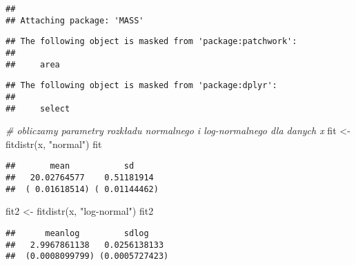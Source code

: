 \documentclass[
]{book}
\newenvironment{Shaded}{\begin{snugshade}}{\end{snugshade}}
\newcommand{\CommentTok}[1]{\textcolor[rgb]{0.56,0.35,0.01}{\textit{#1}}}
\newcommand{\DecValTok}[1]{\textcolor[rgb]{0.00,0.00,0.81}{#1}}
\newcommand{\FunctionTok}[1]{\textcolor[rgb]{0.00,0.00,0.00}{#1}}
\newcommand{\NormalTok}[1]{#1}
\newcommand{\OtherTok}[1]{\textcolor[rgb]{0.56,0.35,0.01}{#1}}
\newcommand{\SpecialCharTok}[1]{\textcolor[rgb]{0.00,0.00,0.00}{#1}}
\newcommand{\StringTok}[1]{\textcolor[rgb]{0.31,0.60,0.02}{#1}}
\begin{document}
\begin{verbatim}
## 
## Attaching package: 'MASS'
\end{verbatim}

\begin{verbatim}
## The following object is masked from 'package:patchwork':
## 
##     area
\end{verbatim}

\begin{verbatim}
## The following object is masked from 'package:dplyr':
## 
##     select
\end{verbatim}

\begin{Shaded}
\begin{Highlighting}[]
\CommentTok{\# obliczamy parametry rozkładu normalnego i log{-}normalnego dla danych x}
\NormalTok{fit }\OtherTok{\textless{}{-}} \FunctionTok{fitdistr}\NormalTok{(x, }\StringTok{"normal"}\NormalTok{)}
\NormalTok{fit}
\end{Highlighting}
\end{Shaded}

\begin{verbatim}
##       mean           sd     
##   20.02764577    0.51181914 
##  ( 0.01618514) ( 0.01144462)
\end{verbatim}

\begin{Shaded}
\begin{Highlighting}[]
\NormalTok{fit2 }\OtherTok{\textless{}{-}} \FunctionTok{fitdistr}\NormalTok{(x, }\StringTok{"log{-}normal"}\NormalTok{)}
\NormalTok{fit2}
\end{Highlighting}
\end{Shaded}

\begin{verbatim}
##      meanlog         sdlog    
##   2.9967861138   0.0256138133 
##  (0.0008099799) (0.0005727423)
\end{verbatim}

\begin{Shaded}
\end{Shaded}
\end{document}
